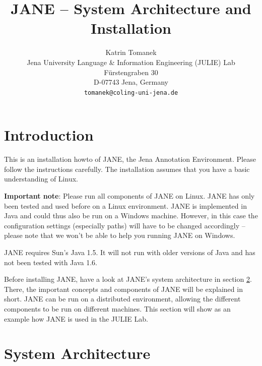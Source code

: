 \documentclass[DIV12,english,11pt,halfparskip]{scrartcl}
\title{JANE -- System Architecture and Installation}
\author{\normalsize Katrin Tomanek\\
  \normalsize  Jena University Language \& Information Engineering (JULIE) Lab\\
  \normalsize F\"urstengraben 30 \\
  \normalsize D-07743 Jena, Germany\\
  {\normalsize \tt tomanek@coling-uni-jena.de} } \date{}
\begin{document}
\maketitle
\newpage
\tableofcontents
\newpage
\section{Introduction}

This is an installation howto of JANE, the Jena Annotation
Environment. Please follow the instructions carefully. The
installation assumes that you have a basic understanding of Linux.

\textbf{Important note}: Please run all components of JANE on Linux.
JANE has only been tested and used before on a Linux environment. JANE
is implemented in Java and could thus also be run on a Windows
machine. However, in this case the configuration settings (especially
paths) will have to be changed accordingly -- please note that we
won't be able to help you running JANE on Windows.

JANE requires Sun's Java 1.5. It will not run with older versions of
Java and has not been tested with Java 1.6.

Before installing JANE, have a look at JANE's system architecture in
section \ref{sec:architecture}. There, the important concepts and
components of JANE will be explained in short. JANE can be run on a
distributed environment, allowing the different components to be run
on different machines. This section will show as an example how JANE
is used in the JULIE Lab.



\section{System Architecture}
\label{sec:architecture}
\end{document}
